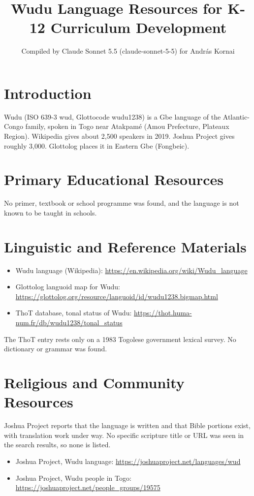 \documentclass[12pt]{article}
\title{Wudu Language Resources for K-12 Curriculum Development}
\author{Compiled by Claude Sonnet 5.5 (claude-sonnet-5-5) for Andr\'as Kornai}
\date{}
\begin{document}
\maketitle

\section{Introduction}
Wudu (ISO 639-3 wud, Glottocode wudu1238) is a Gbe language of the Atlantic-Congo family, spoken in Togo near Atakpam\'e (Amou Prefecture, Plateaux Region). Wikipedia gives about 2,500 speakers in 2019. Joshua Project gives roughly 3,000. Glottolog places it in Eastern Gbe (Fongbeic).

\section{Primary Educational Resources}
No primer, textbook or school programme was found, and the language is not known to be taught in schools.

\section{Linguistic and Reference Materials}
\begin{itemize}
\item Wudu language (Wikipedia): \url{https://en.wikipedia.org/wiki/Wudu_language}
\item Glottolog languoid map for Wudu: \url{https://glottolog.org/resource/languoid/id/wudu1238.bigmap.html}
\item ThoT database, tonal status of Wudu: \url{https://thot.huma-num.fr/db/wudu1238/tonal_status}
\end{itemize}
The ThoT entry rests only on a 1983 Togolese government lexical survey. No dictionary or grammar was found.

\section{Religious and Community Resources}
Joshua Project reports that the language is written and that Bible portions exist, with translation work under way. No specific scripture title or URL was seen in the search results, so none is listed.
\begin{itemize}
\item Joshua Project, Wudu language: \url{https://joshuaproject.net/languages/wud}
\item Joshua Project, Wudu people in Togo: \url{https://joshuaproject.net/people_groups/19575}
\end{itemize}
\end{document}
